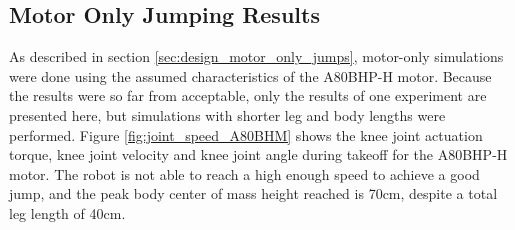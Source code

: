 \subsection{Motor Only Jumping Results}
\label{sec:results_motor_only_jumps}

As described in section \ref{sec:design_motor_only_jumps}, motor-only simulations were done using the assumed characteristics of the A80BHP-H motor. Because the results were so far from acceptable, only the results of one experiment are presented here, but simulations with shorter leg and body lengths were performed. Figure \ref{fig:joint_speed_A80BHM} shows the knee joint actuation torque, knee joint velocity and knee joint angle during takeoff for the A80BHP-H motor. The robot is not able to reach a high enough speed to achieve a good jump, and the peak body center of mass height reached is 70cm, despite a total leg length of 40cm.


